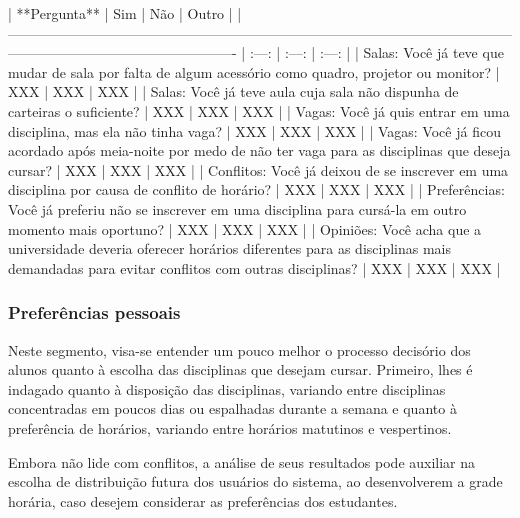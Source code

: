         | **Pergunta**                                                                                                                                                  |  Sim  |  Não  | Outro |
        | ------------------------------------------------------------------------------------------------------------------------------------------------------------- | :---: | :---: | :---: |
        | Salas: Você já teve que mudar de sala por falta de algum acessório como quadro, projetor ou monitor?                                                          |  XXX  |  XXX  |  XXX  |
        | Salas: Você já teve aula cuja sala não dispunha de carteiras o suficiente?                                                                                    |  XXX  |  XXX  |  XXX  |
        | Vagas: Você já quis entrar em uma disciplina, mas ela não tinha vaga?                                                                                         |  XXX  |  XXX  |  XXX  |
        | Vagas: Você já ficou acordado após meia-noite por medo de não ter vaga para as disciplinas que deseja cursar?                                                 |  XXX  |  XXX  |  XXX  |
        | Conflitos: Você já deixou de se inscrever em uma disciplina por causa de conflito de horário?                                                                 |  XXX  |  XXX  |  XXX  |
        | Preferências: Você já preferiu não se inscrever em uma disciplina para cursá-la em outro momento mais oportuno?                                               |  XXX  |  XXX  |  XXX  |
        | Opiniões: Você acha que a universidade deveria oferecer horários diferentes para as disciplinas mais demandadas para evitar conflitos com outras disciplinas? |  XXX  |  XXX  |  XXX  |

    \subsubsection{Preferências pessoais} %

        Neste segmento, visa-se entender um pouco melhor o processo decisório dos alunos quanto à escolha das disciplinas que desejam cursar. Primeiro, lhes é indagado quanto à disposição das disciplinas, variando entre disciplinas concentradas em poucos dias ou espalhadas durante a semana e quanto à preferência de horários, variando entre horários matutinos e vespertinos.

        Embora não lide com conflitos, a análise de seus resultados pode auxiliar na escolha de distribuição futura dos usuários do sistema, ao desenvolverem a grade horária, caso desejem considerar as preferências dos estudantes.


